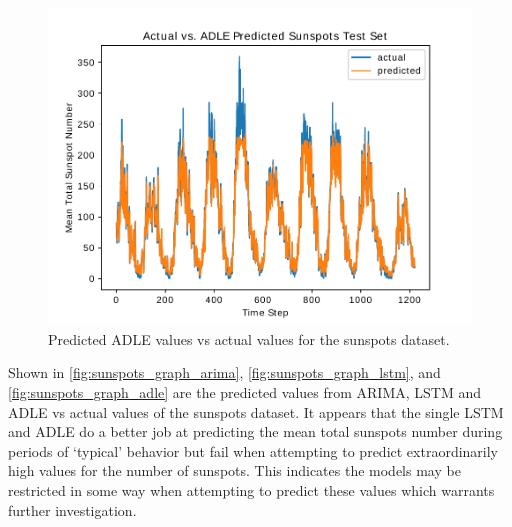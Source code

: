 \documentclass{article}
\begin{document}
\begin{figure}
	\centering
  \includegraphics[scale=0.28]{imgs/adle_results_sunspots.pdf}
  \caption{Predicted ADLE values vs actual values for the sunspots dataset.}\label{fig:sunspots_graph_adle}
\endminipage
\end{figure}

Shown in \autoref{fig:sunspots_graph_arima}, \autoref{fig:sunspots_graph_lstm}, and \autoref{fig:sunspots_graph_adle} are the predicted values from ARIMA, LSTM and ADLE vs actual values of the sunspots dataset. It appears that the single LSTM and ADLE do a better job at predicting the mean total sunspots number during periods of `typical' behavior but fail when attempting to predict extraordinarily high values for the number of sunspots. This indicates the models may be restricted in some way when attempting to predict these values which warrants further investigation.
\end{document}
